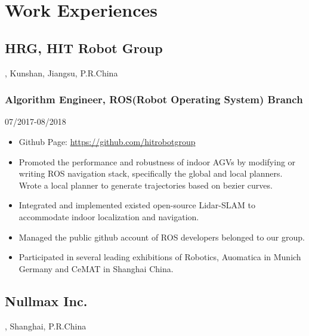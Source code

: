 \documentclass{article}
\begin{document}
\section{Work Experiences}
\subsection{HRG, HIT Robot Group}, Kunshan, Jiangsu, P.R.China
\subsubsection{Algorithm Engineer, ROS(Robot Operating System) Branch} \hfill 07/2017-08/2018
\begin{itemize}[noitemsep,topsep=1pt]
\item Github Page: \url{https://github.com/hitrobotgroup}
\item Promoted the performance and robustness of indoor AGVs by modifying or writing ROS navigation stack, specifically the global and local planners. Wrote a local planner to generate trajectories based on bezier curves.
\item Integrated and implemented existed open-source Lidar-SLAM to accommodate indoor localization and navigation.
\item Managed the public github account of ROS developers belonged to our group.  
\item Participated in several leading exhibitions of Robotics, Auomatica in Munich Germany and CeMAT in Shanghai China. 
\end{itemize}

\subsection{Nullmax Inc.}, Shanghai, P.R.China
\end{document}
